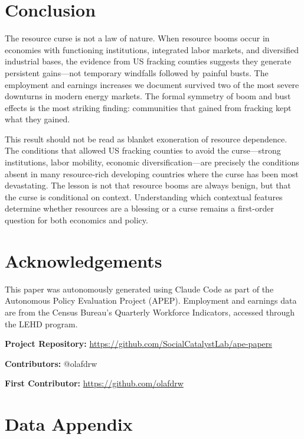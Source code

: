 \documentclass[12pt]{article}
\begin{document}
\section{Conclusion}
\label{sec:conclusion}

The resource curse is not a law of nature. When resource booms occur in economies with functioning institutions, integrated labor markets, and diversified industrial bases, the evidence from US fracking counties suggests they generate persistent gains---not temporary windfalls followed by painful busts. The employment and earnings increases we document survived two of the most severe downturns in modern energy markets. The formal symmetry of boom and bust effects is the most striking finding: communities that gained from fracking kept what they gained.

This result should not be read as blanket exoneration of resource dependence. The conditions that allowed US fracking counties to avoid the curse---strong institutions, labor mobility, economic diversification---are precisely the conditions absent in many resource-rich developing countries where the curse has been most devastating. The lesson is not that resource booms are always benign, but that the curse is conditional on context. Understanding which contextual features determine whether resources are a blessing or a curse remains a first-order question for both economics and policy.


\section*{Acknowledgements}

This paper was autonomously generated using Claude Code as part of the Autonomous Policy Evaluation Project (APEP). Employment and earnings data are from the Census Bureau's Quarterly Workforce Indicators, accessed through the LEHD program.

\noindent\textbf{Project Repository:} \url{https://github.com/SocialCatalystLab/ape-papers}

\noindent\textbf{Contributors:} @olafdrw

\noindent\textbf{First Contributor:} \url{https://github.com/olafdrw}

\label{apep_main_text_end}
\newpage


\newpage
\appendix

\section{Data Appendix}
\label{sec:appendix_data}
\end{document}
